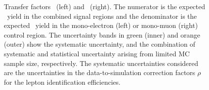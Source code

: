 \begin{figure}[htbp]
  \centering
  \caption{
    Transfer factors \RWe\ (left) and \RWm\ (right).
    The numerator is the expected \zinvg\ yield in the combined signal regions and the denominator is the expected \wlng\ yield in the mono-electron (left) or mono-muon (right) control region.
    The uncertainty bands in green (inner) and orange (outer) show the systematic uncertainty, and the combination of systematic and statistical uncertainty arising from limited MC sample size, respectively. 
    The systematic uncertainties considered are the uncertainties in the data-to-simulation correction factors $\rho$ for the lepton identification efficiencies.
  }
  \label{fig:tf_w}
\end{figure}


